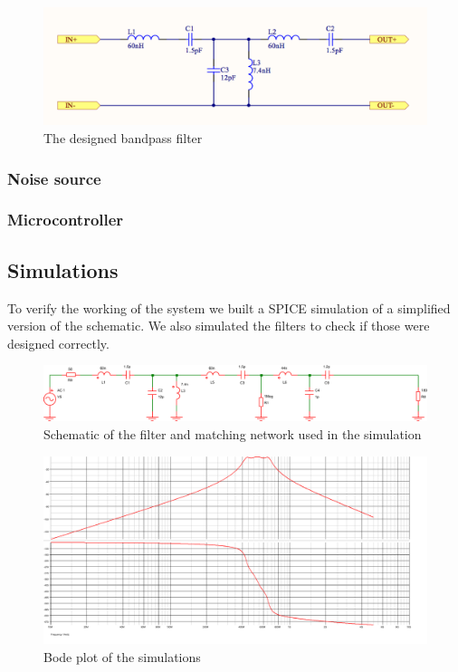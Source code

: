 \documentclass[a4paper, openany, oneside]{memoir}
\begin{document}
\begin{figure}[h]
    \centering
    \includegraphics[width=\textwidth]{filter.png}
    \caption{The designed bandpass filter}
    \label{fig:filter}
\end{figure}

\subsubsection{Noise source}

\subsubsection{Microcontroller}

\subsection{Simulations}
To verify the working of the system we built a SPICE simulation of a simplified version of the schematic. We also simulated the filters to check if those were designed correctly.
\begin{figure}[h]
    \centering
    \includegraphics[width=\textwidth]{sim_schematic.pdf}
    \caption{Schematic of the filter and matching network used in the simulation}
    \label{fig:sim_schematic}
\end{figure}

\begin{figure}[h]
    \centering
    \includegraphics[width=\textwidth]{bode.pdf}
    \caption{Bode plot of the simulations}
    \label{fig:sim_bode}
\end{figure}
\end{document}
